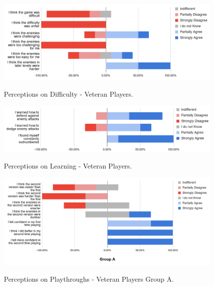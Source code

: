 

\begin{figure}[!ht]
    \begin{center}
    \caption{Perceptions on Difficulty - Veteran Players.}
        \includegraphics[width=36em]{figures/fig-perception-difficulty-veteran-players.png}
        \label{fig:perception-difficulty-veteran-players}
    \end{center}
\end{figure}

\begin{figure}[!ht]
    \begin{center}
    \caption{Perceptions on Learning - Veteran Players.}
        \includegraphics[width=36em]{figures/fig-perception-learning-veteran-players.png}
        \label{fig:perception-learning-veteran-players}
    \end{center}
\end{figure}

\begin{figure}[!ht]
    \begin{center}
    \caption{Perceptions on Playthroughs - Veteran Players Group A.}
        \includegraphics[width=36em]{figures/fig-perception-versions-veteran-players-group-a.png}
        \label{fig:perception-playthrough-veteran-players-group-a}
    \end{center}
\end{figure}

